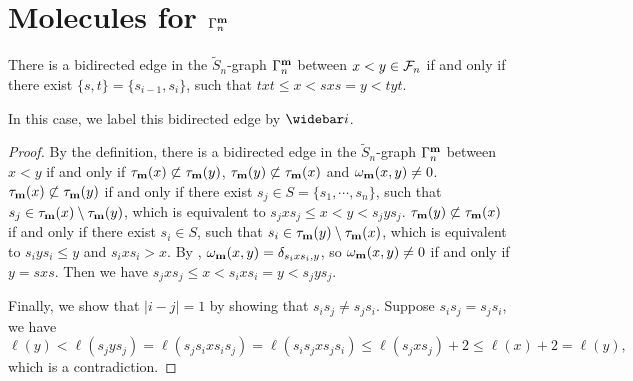 \documentclass[11pt]{article}
\begin{document}
\section{Molecules for $\Gamma^{\mathbf{m}}_n$}\label{mole-sect}
\begin{proposition}
There is a bidirected edge in the $\tilde S_n$-graph $\Gamma^{\mathbf{m}}_n$ between $x<y\in\mathcal F_n$ if and only if there exist $\{s,t\}=\{s_{i-1},s_i\}$, such that $txt\le x<sxs=y<tyt$.
\end{proposition}
In this case, we label this bidirected edge by $\widebar i$.
\begin{proof}
By the definition, there is a bidirected edge in the $\tilde S_n$-graph $\Gamma^{\mathbf{m}}_n$ between $x<y$ if and only if $\tau_{\mathbf{m}}(x)\not\subset\tau_{\mathbf{m}}(y)$, $\tau_{\mathbf{m}}(y)\not\subset\tau_{\mathbf{m}}(x)$ and $\omega_{\mathbf{m}}(x,y)\neq0$. $\tau_{\mathbf{m}}(x)\not\subset\tau_{\mathbf{m}}(y)$ if and only if there exist $s_j\in S=\{s_1,\cdots,s_n\}$, such that $s_j\in\tau_{\mathbf{m}}(x)\setminus\tau_{\mathbf{m}}(y)$, which is equivalent to $s_jxs_j\le x<y<s_jys_j$. $\tau_{\mathbf{m}}(y)\not\subset\tau_{\mathbf{m}}(x)$ if and only if there exist $s_i\in S$, such that $s_i\in\tau_{\mathbf{m}}(y)\setminus\tau_{\mathbf{m}}(x)$, which is equivalent to $s_iys_i\le y$ and $s_ixs_i>x$. By \cite[Lemma 3.25]{Marberg}, $\omega_{\mathbf{m}}(x,y)=\delta_{s_ixs_i,y}$, so 
$\omega_{\mathbf{m}}(x,y)\neq0$ if and only if $y=sxs$. Then we have $s_jxs_j\le x<s_ixs_i= y<s_jys_j$.

Finally, we show that $|i-j|=1$ by showing that $s_is_j\neq s_js_i$. Suppose $s_is_j=s_js_i$, we have 
\[
\ell(y)<\ell(s_jys_j)=\ell(s_js_ixs_is_j)=\ell(s_is_jxs_js_i)\leq\ell(s_jxs_j)+2\leq\ell(x)+2=\ell(y),
\]
which is a contradiction.
\end{proof}
\end{document}
